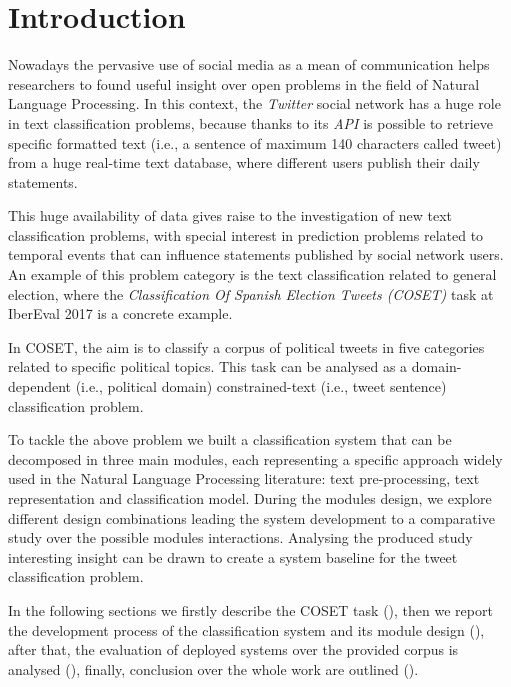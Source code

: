 \section{Introduction} \label{sec:introduction}

Nowadays the pervasive use of social media as a mean of communication helps researchers to found useful insight over open problems in the field of Natural Language Processing. %
In this context, the \emph{Twitter} social network has a huge role in text classification problems, because thanks to its \emph{API} is possible to retrieve specific formatted text (i.e., a sentence of maximum 140 characters called tweet) from a huge real-time text database, where different users publish their daily statements.

This huge availability of data gives raise to the investigation of new text classification problems, with special interest in prediction problems related to temporal events that can influence statements published by social network users. An example of this problem category is the text classification related to general election, where the  \emph{Classification Of Spanish Election Tweets (COSET)} task at IberEval 2017 is a concrete example. %

In COSET, the aim is to classify a corpus of political tweets in five categories related to specific political topics. This task can be analysed as a domain-dependent (i.e., political domain) constrained-text (i.e., tweet sentence) classification problem.

To tackle the above problem we built a classification system that can be decomposed in three main modules, each representing a specific approach widely used in the Natural Language Processing literature: text pre-processing, text representation and classification model.
During the modules design, we explore different design combinations leading the system development to a comparative study over the possible modules interactions.
Analysing the produced study interesting insight can be drawn to create a system baseline for the tweet classification problem.

In the following sections we firstly describe the COSET task (), then we report the development process of the classification system and its module design (), after that, the evaluation of deployed systems over the provided corpus is analysed (), finally, conclusion over the whole work are outlined ().



